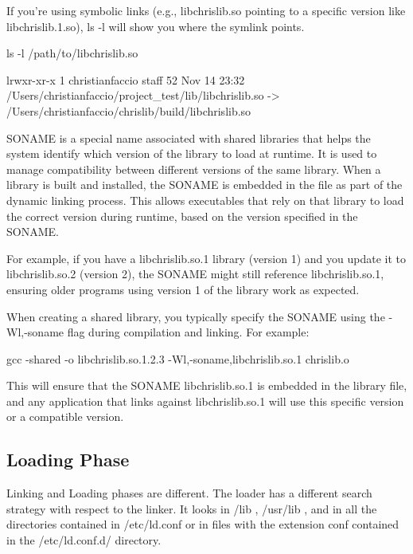 If you're using symbolic links (e.g., libchrislib.so pointing to a specific version like libchrislib.1.so), ls -l will show you where the symlink points.

\begin{codeblock}[language=bash]
ls -l /path/to/libchrislib.so
\end{codeblock}
\begin{codeblock}[language=bash]
lrwxr-xr-x  1 christianfaccio  staff  52 Nov 14 23:32 /Users/christianfaccio/project_test/lib/libchrislib.so -> /Users/christianfaccio/chrislib/build/libchrislib.so
\end{codeblock}



SONAME is a special name associated with shared libraries that helps the system identify which version of the library to load at runtime. It is used to manage compatibility between different versions of the same library. When a library is built and installed, the SONAME is embedded in the file as part of the dynamic linking process. This allows executables that rely on that library to load the correct version during runtime, based on the version specified in the SONAME. 

For example, if you have a libchrislib.so.1 library (version 1) and you update it to libchrislib.so.2 (version 2), the SONAME might still reference libchrislib.so.1, ensuring older programs using version 1 of the library work as expected.

When creating a shared library, you typically specify the SONAME using the -Wl,-soname flag during compilation and linking. For example:

\begin{codeblock}[language=bash]
gcc -shared -o libchrislib.so.1.2.3 -Wl,-soname,libchrislib.so.1 chrislib.o
\end{codeblock}

This will ensure that the SONAME libchrislib.so.1 is embedded in the library file, and any application that links against libchrislib.so.1 will use this specific version or a compatible version.

\subsection*{Loading Phase}

Linking and Loading phases are different. The loader has a different search strategy with respect to the linker. It looks in /lib , /usr/lib ,
and in all the directories contained in /etc/ld.conf or in files with the extension conf contained
in the /etc/ld.conf.d/ directory.








